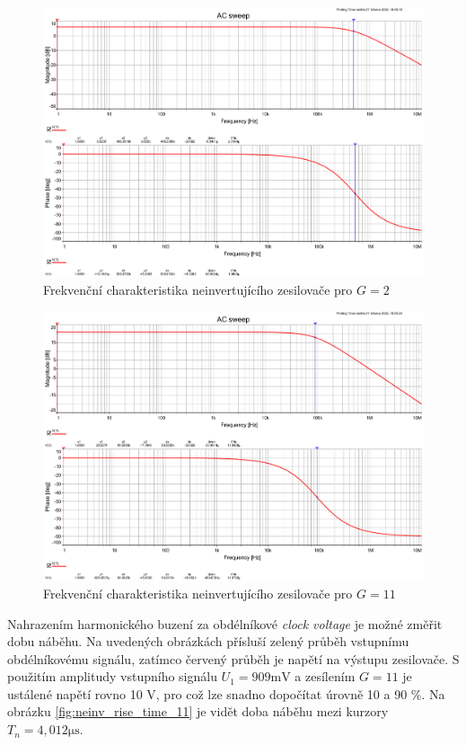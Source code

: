 \documentclass[twoside]{article}
\begin{document}
\begin{figure}[h!]
    \centering
    \includegraphics[width=0.92\linewidth]{bode_noninv_2.pdf}
    \caption{Frekvenční charakteristika neinvertujícího zesilovače pro $G=2$}
    \label{fig:bode_neinv_2}
\end{figure}

\begin{figure}[h!]
    \centering
    \includegraphics[width=0.92\linewidth]{bode_noninv_11.pdf}
    \caption{Frekvenční charakteristika neinvertujícího zesilovače pro $G=11$}
    \label{fig:bode_neinv_11}
\end{figure}

\newpage

Nahrazením harmonického buzení za obdélníkové \textit{clock voltage} je možné změřit dobu náběhu.
Na uvedených obrázkách přísluší zelený průběh vstupnímu obdélníkovému signálu, zatímco
červený průběh je napětí na výstupu zesilovače.
S použitím amplitudy vstupního signálu $U_1 = 909 \si{\milli\volt}$ a zesílením $G = 11$
je ustálené napětí rovno 10 \si{\volt}, pro což lze snadno dopočítat úrovně 10 a 90 \%.
Na obrázku \ref{fig:neinv_rise_time_11} je vidět doba náběhu mezi kurzory $T_n = 4,012 \si{\micro\second}$.
\end{document}
